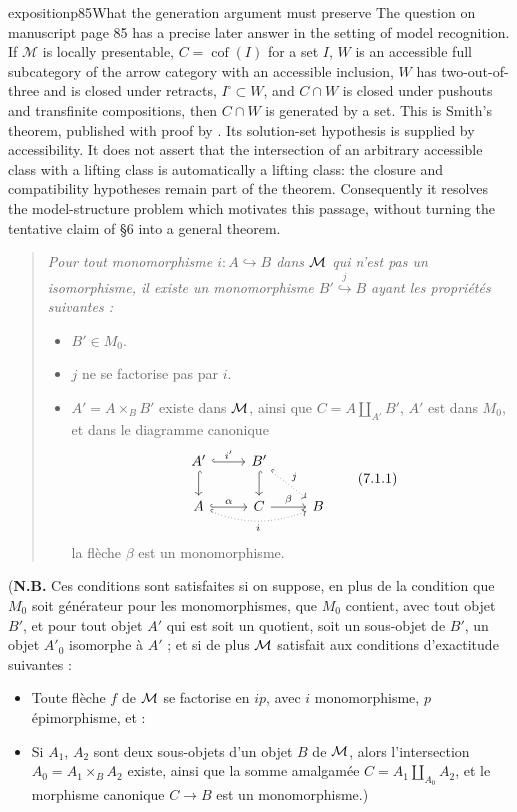 \begin{dcomment}{exposition}{p85}{What the generation argument must preserve}
The question on manuscript page 85 has a precise later answer in the setting of model recognition. If $\mathcal M$ is locally presentable, $C=\operatorname{cof}(I)$ for a set $I$, $W$ is an accessible full subcategory of the arrow category with an accessible inclusion, $W$ has two-out-of-three and is closed under retracts, $I^{\square}\subset W$, and $C\cap W$ is closed under pushouts and transfinite compositions, then $C\cap W$ is generated by a set. This is Smith's theorem, published with proof by \citet[Theorem 1.7 and Lemmas 1.8--1.9]{Beke2000}. Its solution-set hypothesis is supplied by accessibility. It does not assert that the intersection of an arbitrary accessible class with a lifting class is automatically a lifting class: the closure and compatibility hypotheses remain part of the theorem. Consequently it resolves the model-structure problem which motivates this passage, without turning the tentative claim of \S6 into a general theorem.
\end{dcomment}


\begin{quote}
\itshape
Pour tout monomorphisme $i : A \hookrightarrow B$ dans $\mathcal{M}$ qui n'est pas un isomorphisme, il existe un monomorphisme $B' \overset{j}{\hookrightarrow} B$ ayant les propriétés suivantes :
\begin{itemize}
\item[\textup{a)}] $B' \in M_0$.
\item[\textup{b)}] $j$ ne se factorise pas par $i$.
\item[\textup{c)}] $A' = A \times_B B'$ existe dans $\mathcal{M}$, ainsi que $C = A \amalg_{A'} B'$, $A'$ est dans $M_0$, et dans le diagramme canonique
\[
\begin{tikzcd}
A' \arrow[r, hook, "i'"] \arrow[d, hook] & B' \arrow[d, hook] \arrow[dr, hook, dotted, "j"] & \\
A \arrow[r, hook, "\alpha"] \arrow[rr, hook, dotted, bend right=20, "i"'] & C \arrow[r, "\beta"] & B
\end{tikzcd}
\tag*{(7.1.1)}
\]
la flèche $\beta$ est un monomorphisme.
\end{itemize}
\end{quote}

(\textbf{N.B.} Ces conditions sont satisfaites si on suppose, en plus de la condition que $M_0$ soit générateur pour les monomorphismes, que $M_0$ contient, avec tout objet $B'$, et pour tout objet $A'$ qui est soit un quotient, soit un sous-objet de $B'$, un objet $A'_0$ isomorphe à $A'$ ; et si de plus $\mathcal{M}$ satisfait aux conditions d'exactitude suivantes :
\begin{itemize}
\item[1$^{\circ}$)] Toute flèche $f$ de $\mathcal{M}$ se factorise en $ip$, avec $i$ monomorphisme, $p$ épimorphisme, et :
\item[2$^{\circ}$)] Si $A_1$, $A_2$ sont deux sous-objets d'un objet $B$ de $\mathcal{M}$, alors l'intersection $A_0 = A_1 \times_B A_2$ existe, ainsi que la
somme amalgamée $C = A_1 \amalg_{A_0} A_2$, et le morphisme canonique $C \longrightarrow B$ est un monomorphisme.)
\end{itemize}

